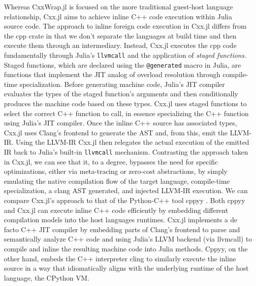 Whereas CxxWrap.jl is focused on the more traditional guest-host language relationship, Cxx.jl \cite{JuliaInterop_Cxxjl} aims to achieve inline C++ code execution within Julia source code. The approach to inline foreign code execution in Cxx.jl differs from the cpp crate in that we don't separate the languages at build time and then execute them through an intermediary. Instead, Cxx.jl executes the cpp code fundamentally through Julia's \texttt{llvmcall} and the application of \textit{staged functions}. Staged functions, which are declared using the \texttt{@generated} macro in Julia, are functions that implement the JIT analog of overload resolution through compile-time specialization. Before generating machine code, Julia's JIT compiler evaluates the types of the staged function's arguments and then conditionally produces the machine code based on these types. Cxx.jl uses staged functions to select the correct C++ function to call, in essence specializing the C++ function using Julia's JIT compiler. Once the inline C++ source has associated types, Cxx.jl uses Clang's frontend to generate the AST and, from this, emit the LLVM-IR. Using the LLVM-IR Cxx.jl then relegates the actual execution of the emitted IR back to Julia's built-in \texttt{llvmcall} mechanism. Contrasting the approach taken in Cxx.jl, we can see that it, to a degree, bypasses the need for specific optimizations, either via meta-tracing or zero-cost abstractions, by simply emulating the native compilation flow of the target language, \ie compile-time specialization, a clang AST generated, and injected LLVM-IR execution. We can compare Cxx.jl's approach to that of the Python-C++ tool cppyy \cite{Kundu2023Efficient}. Both cppyy and Cxx.jl can execute inline C++ code efficiently by embedding different compilation models into the host languages runtimes. Cxx.jl implements a de facto C++ JIT compiler by embedding parts of Clang's frontend to parse and semantically analyze C++ code and using Julia's LLVM backend (via llvmcall) to compile and inline the resulting machine code into Julia methods. Cppyy, on the other hand, embeds the C++ interpreter cling  \cite{Vassilev2025root} to similarly execute the inline source in a way that idiomatically aligns with the underlying runtime of the host language, \ie the CPython VM.

